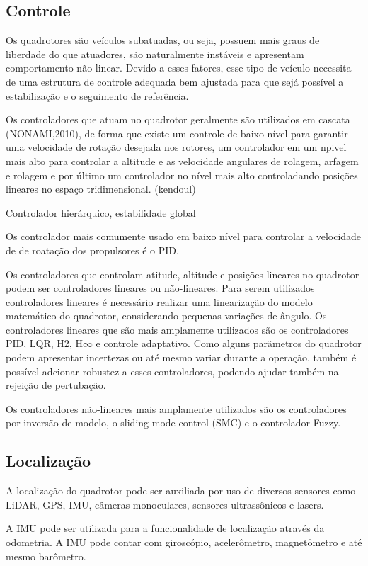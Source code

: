 \subsection{Controle}
Os quadrotores são veículos subatuadas, ou seja, possuem mais graus de liberdade do que atuadores, são naturalmente instáveis e apresentam comportamento não-linear. Devido a esses fatores, esse tipo de veículo necessita de uma estrutura de controle adequada bem ajustada para que sejá possível a estabilização e o seguimento de referência.

Os controladores que atuam no quadrotor geralmente são utilizados em cascata (NONAMI,2010), de forma que existe um controle de baixo nível para garantir uma velocidade de rotação desejada nos rotores, um controlador em um npivel mais alto para controlar a altitude e as velocidade angulares de rolagem, arfagem e rolagem e por último um controlador no nível mais alto controladando posições lineares no espaço tridimensional. (kendoul)

Controlador hierárquico, estabilidade global

Os controlador mais comumente usado em baixo nível para controlar a velocidade de de roatação dos propulsores é o PID. 

Os controladores que controlam atitude, altitude e posições lineares no quadrotor podem ser controladores lineares ou não-lineares. Para serem utilizados controladores lineares é necessário realizar uma linearização do modelo matemático do quadrotor, considerando pequenas variações de ângulo. Os controladores lineares que são mais amplamente utilizados são os controladores PID, LQR, H2, H$\infty$ e controle adaptativo. Como alguns parãmetros do quadrotor podem apresentar incertezas ou até mesmo variar durante a operação, também é possível adcionar robustez a esses controladores, podendo ajudar também na rejeição de pertubação.

Os controladores não-lineares mais amplamente utilizados são os controladores por inversão de modelo, o sliding mode control (SMC) e o controlador Fuzzy.

\subsection{Localização}
A localização do quadrotor pode ser auxiliada por uso de diversos sensores como LiDAR, GPS, IMU, câmeras monoculares, sensores ultrassônicos e lasers.

A IMU pode ser utilizada para a funcionalidade de localização através da odometria. A IMU pode contar com giroscópio, acelerômetro, magnetômetro e até mesmo barômetro.

